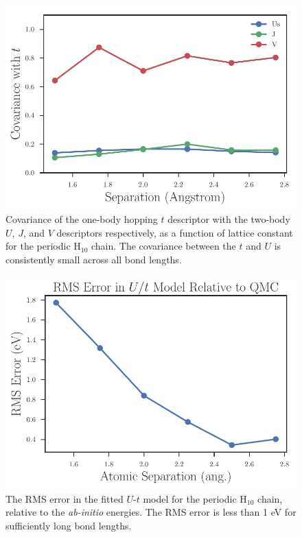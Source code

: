  \begin{figure}
\centering
\includegraphics[scale=0.6]{./Figures/t_covariance_vs_separation.pdf}
\caption{Covariance of the one-body hopping $t$ descriptor with the two-body $U$, $J$, and $V$ descriptors respectively, as a function of lattice constant for the periodic H$_{10}$ chain.  The covariance between the $t$ and $U$ is consistently small across all bond lengths.}\label{fig:Cov-of-Descriptors}
 \end{figure}
 
 \begin{figure}
\centering
\includegraphics[scale=0.6]{./Figures/rms_ut_error_vs_separation_h_chain.pdf}
\caption{The RMS error in the fitted $U$-$t$ model for the periodic H$_{10}$ chain, relative to the \textit{ab-initio} energies. The RMS error is less than 1 eV for sufficiently long bond lengths.}\label{fig:RMS-Error-vs-Bond}
 \end{figure}
 

